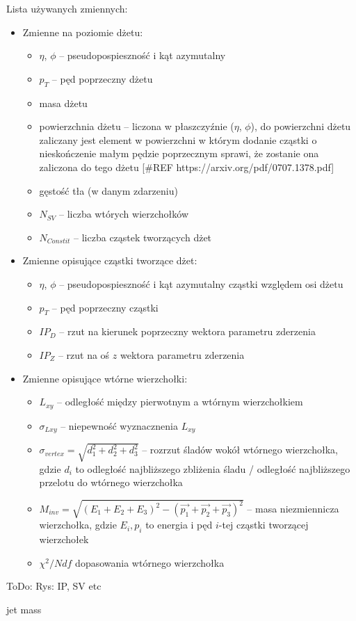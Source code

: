 Lista używanych zmiennych:
\begin{itemize}
	\item Zmienne na poziomie dżetu:
	\begin{itemize}	
		\item $\eta$, $\phi$ -- pseudopospieszność  i kąt azymutalny
		\item $p_T$ -- pęd poprzeczny dżetu
		\item masa dżetu
		\item powierzchnia dżetu -- liczona w płaszczyźnie ($\eta$, $\phi$),   do powierzchni dżetu zaliczany jest element w powierzchni w którym dodanie cząstki o nieskończenie małym pędzie poprzecznym sprawi, że zostanie ona zaliczona do tego dżetu  [\#REF https://arxiv.org/pdf/0707.1378.pdf]
		\item gęstość tła (w danym zdarzeniu)
		\item $N_{SV}$ -- liczba wtórych wierzchołków
		\item $N_{Constit}$ -- liczba cząstek tworzących dżet
	\end{itemize}
	
	
	\item Zmienne opisujące cząstki tworzące dżet:
	\begin{itemize}	
		\item $\eta$, $\phi$ -- pseudopospieszność i kąt azymutalny cząstki względem osi dżetu
		\item $p_T$ -- pęd poprzeczny cząstki
		\item $IP_D$ -- rzut na kierunek poprzeczny wektora parametru zderzenia
		\item $IP_Z$ -- rzut na oś $z$ wektora parametru zderzenia
	\end{itemize}	
	
	
	\item Zmienne opisujące wtórne wierzchołki:
	\begin{itemize}	
		\item $L_{xy}$ -- odległość między pierwotnym a wtórnym wierzchołkiem 
		\item $\sigma_{Lxy}$ -- niepewność wyznacznenia $L_{xy}$
		\item $\sigma_{vertex} = \sqrt{d_1^2 + d_2^2 + d_3^2}$ -- rozrzut śladów  wokół wtórnego wierzchołka, gdzie $d_i$ to odległość najbliższego zbliżenia śladu / odległość najbliższego przelotu do wtórnego wierzchołka  %
		\item $M_{inv} = \sqrt{(E_1 + E_2 + E_3)^2 - (\vec{p_1} + \vec{p_2} + \vec{p_3})^2}$ -- masa niezmiennicza wierzchołka, gdzie $E_i, p_i$ to energia i pęd $i$-tej cząstki tworzącej wierzchołek
		\item $\chi^2/Ndf$  dopasowania wtórnego wierzchołka
	\end{itemize}
\end{itemize}



ToDo: Rys: IP, SV etc

jet mass
